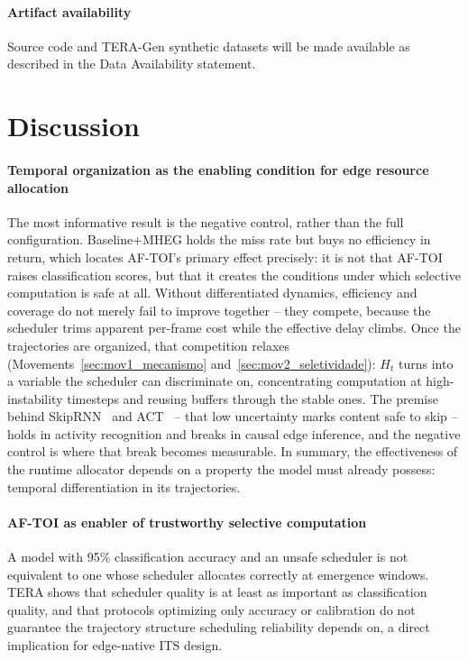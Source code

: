 \documentclass[a4paper,fleqn]{cas-dc}
\newcommand{\TERAGen}{\mbox{TERA-Gen}\xspace}
\newcommand{\AFTOI}{\mbox{AF-TOI}\xspace}
\begin{document}
\paragraph{Artifact availability}
Source code and \TERAGen synthetic datasets will be made available as
described in the Data Availability statement.
\section{Discussion}
\label{sec:discussao}
\paragraph{Temporal organization as the enabling condition for edge resource allocation}
The most informative result is the negative control, rather than the full configuration. Baseline+MHEG holds the miss rate but buys no efficiency in return,
which locates \AFTOI's primary effect precisely: it is not that \AFTOI raises
classification scores, but that it creates the conditions under which selective
computation is safe at all. Without differentiated dynamics, efficiency and
coverage do not merely fail to improve together -- they compete, because the
scheduler trims apparent per-frame cost while the effective delay climbs. Once the
trajectories are organized, that competition relaxes
(Movements~\ref{sec:mov1_mecanismo} and~\ref{sec:mov2_seletividade}): $H_t$ turns
into a variable the scheduler can discriminate on, concentrating computation at
high-instability timesteps and reusing buffers through the stable ones. The premise
behind SkipRNN~\cite{campos2018skip} and ACT~\cite{graves2016adaptive} -- that low
uncertainty marks content safe to skip -- holds in activity recognition and breaks
in causal edge inference, and the negative control is where that break becomes
measurable. In summary, the effectiveness of the runtime allocator depends on a property the model must already possess: temporal differentiation in its trajectories.
\paragraph{AF-TOI as enabler of trustworthy selective computation}
A model with 95\% classification accuracy and an unsafe scheduler is not
equivalent to one whose scheduler allocates correctly at emergence windows. TERA
shows that scheduler quality is at least as important as classification quality,
and that protocols optimizing only accuracy or calibration do not guarantee the
trajectory structure scheduling reliability depends on, a direct implication for
edge-native ITS design.
\end{document}
